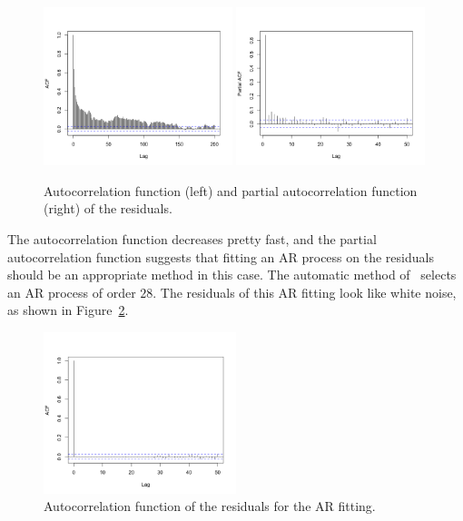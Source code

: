 \begin{figure}[h]
\begin{center}
\includegraphics[width=0.49\textwidth]{./figures/acf_res_shan}
\includegraphics[width=0.49\textwidth]{./figures/pacf_res_shan}
\end{center}
\caption{Autocorrelation function (left) and partial autocorrelation function (right) of the residuals.}
\label{acf_pacf_shan}
\end{figure}
The autocorrelation function  decreases pretty fast, and the partial autocorrelation function suggests that fitting an AR process on the residuals should be an appropriate method in this case. The automatic  method of \slmf~selects an AR process of order $28$. The residuals of this AR fitting look like white noise, as shown in Figure~\ref{res_shan_AR28}.
\begin{figure}[h]
\begin{center}
\includegraphics[width=0.5\textwidth]{./figures/res_shan_AR28}
\end{center}
\caption{Autocorrelation function of the residuals for the AR fitting.}
\label{res_shan_AR28}
\end{figure}
